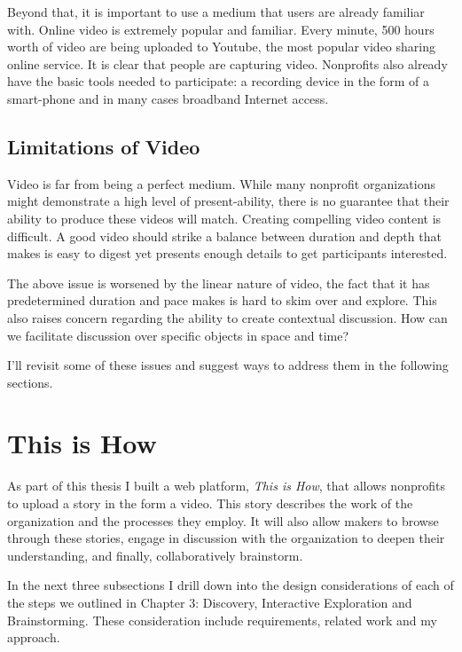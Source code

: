 
Beyond that, it is important to use a medium that users are already familiar with. Online video is extremely popular and familiar. Every minute, 500 hours worth of video are being uploaded to Youtube\cite{youtubestats}, the most popular video sharing online service. It is clear that people are capturing video. Nonprofits also already have the basic tools needed to participate: a recording device in the form of a smart-phone and in many cases broadband Internet access. 

\subsection{Limitations of Video} 

Video is far from being a perfect medium. While many nonprofit organizations might demonstrate a high level of present-ability, there is no guarantee that their ability to produce these videos will match. Creating compelling video content is difficult. A good video should strike a balance between duration and depth that makes is easy to digest yet presents enough details to get participants interested. 

The above issue is worsened by the linear nature of video, the fact that it has predetermined duration and pace makes is hard to skim over and explore. This also raises concern regarding the ability to create contextual discussion. How can we facilitate discussion over specific objects in space and time?

I'll revisit some of these issues and suggest ways to address them in the following sections.

\section{This is How}

As part of this thesis I built a web platform, \textit{This is How}, that allows nonprofits to upload a story in the form a video. This story describes the work of the organization and the processes they employ. It will also allow makers to browse through these stories, engage in discussion with the organization to deepen their understanding, and finally, collaboratively brainstorm. 

In the next three subsections I drill down into the design considerations of each of the steps we outlined in Chapter 3: Discovery, Interactive Exploration and Brainstorming. These consideration include requirements, related work and my approach. 

